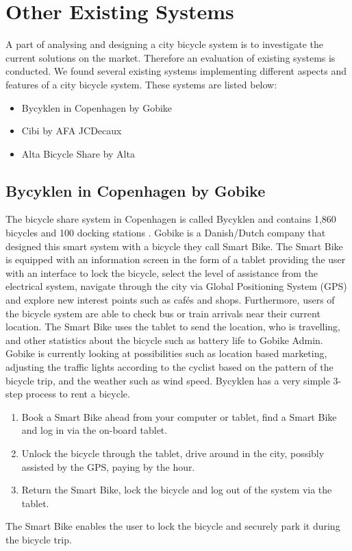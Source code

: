 \section{Other Existing Systems}\label{sec:existing-systems}
A part of analysing and designing a city bicycle system is to investigate the current solutions on the market. 
Therefore an evaluation of existing systems is conducted.
We found several existing systems implementing different aspects and features of a city bicycle system. 
These systems are listed below:
\begin{itemize}
\item Bycyklen in Copenhagen by Gobike
\item Cibi by AFA JCDecaux
\item Alta Bicycle Share by Alta
\end{itemize}
\subsection{Bycyklen in Copenhagen by Gobike}
The bicycle share system in Copenhagen is called Bycyklen and contains 1,860 bicycles and 100 docking stations \citep{misc:bycyklen}. 
Gobike is a Danish/Dutch company that designed this smart system with a bicycle they call Smart Bike. 
The Smart Bike is equipped with an information screen in the form of a tablet providing the user with an interface to lock the bicycle, select the level of assistance from the electrical system, navigate through the city via Global Positioning System (GPS) and explore new interest points such as cafés and shops.
Furthermore, users of the bicycle system are able to check bus or train arrivals near their current location.
The Smart Bike uses the tablet to send the location, who is travelling, and other statistics about the bicycle such as battery life to Gobike Admin.
Gobike is currently looking at possibilities such as location based marketing, adjusting the traffic lights according to the cyclist based on the pattern of the bicycle trip, and the weather such as wind speed.
Bycyklen has a very simple 3-step process to rent a bicycle.
\begin{enumerate}
\item Book a Smart Bike ahead from your computer or tablet, find a Smart Bike and log in via the on-board tablet.
\item Unlock the bicycle through the tablet, drive around in the city, possibly assisted by the GPS, paying by the hour.
\item Return the Smart Bike, lock the bicycle and log out of the system via the tablet.
\end{enumerate}
The Smart Bike enables the user to lock the bicycle and securely park it during the bicycle trip.

